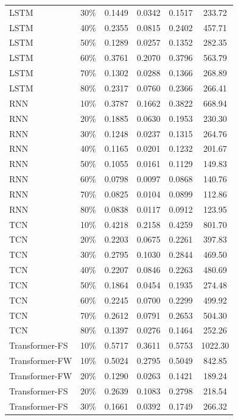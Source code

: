 \begin{longtable}{l c c c c c}
        LSTM & 30\% & 0.1449 & 0.0342 & 0.1517 & 233.72 \\
        LSTM & 40\% & 0.2355 & 0.0815 & 0.2402 & 457.71 \\
        LSTM & 50\% & 0.1289 & 0.0257 & 0.1352 & 282.35 \\
        LSTM & 60\% & 0.3761 & 0.2070 & 0.3796 & 563.79 \\
        LSTM & 70\% & 0.1302 & 0.0288 & 0.1366 & 268.89 \\
        LSTM & 80\% & 0.2317 & 0.0760 & 0.2366 & 266.41 \\
        RNN & 10\% & 0.3787 & 0.1662 & 0.3822 & 668.94 \\
        RNN & 20\% & 0.1885 & 0.0630 & 0.1953 & 230.30 \\
        RNN & 30\% & 0.1248 & 0.0237 & 0.1315 & 264.76 \\
        RNN & 40\% & 0.1165 & 0.0201 & 0.1232 & 201.67 \\
        RNN & 50\% & 0.1055 & 0.0161 & 0.1129 & 149.83 \\
        RNN & 60\% & 0.0798 & 0.0097 & 0.0868 & 140.76 \\
        RNN & 70\% & 0.0825 & 0.0104 & 0.0899 & 112.86 \\
        RNN & 80\% & 0.0838 & 0.0117 & 0.0912 & 123.95 \\
        TCN & 10\% & 0.4218 & 0.2158 & 0.4259 & 801.70 \\
        TCN & 20\% & 0.2203 & 0.0675 & 0.2261 & 397.83 \\
        TCN & 30\% & 0.2795 & 0.1030 & 0.2844 & 469.50 \\
        TCN & 40\% & 0.2207 & 0.0846 & 0.2263 & 480.69 \\
        TCN & 50\% & 0.1864 & 0.0454 & 0.1935 & 274.48 \\
        TCN & 60\% & 0.2245 & 0.0700 & 0.2299 & 499.92 \\
        TCN & 70\% & 0.2612 & 0.0791 & 0.2653 & 504.30 \\
        TCN & 80\% & 0.1397 & 0.0276 & 0.1464 & 252.26 \\
        Transformer-FS & 10\% & 0.5717 & 0.3611 & 0.5753 & 1022.30 \\
        Transformer-FW & 10\% & 0.5024 & 0.2795 & 0.5049 & 842.85 \\
        Transformer-FW & 20\% & 0.1290 & 0.0263 & 0.1421 & 189.24 \\
        Transformer-FS & 20\% & 0.2639 & 0.1083 & 0.2798 & 218.54 \\
        Transformer-FS & 30\% & 0.1661 & 0.0392 & 0.1749 & 266.32 \\

\end{longtable}

